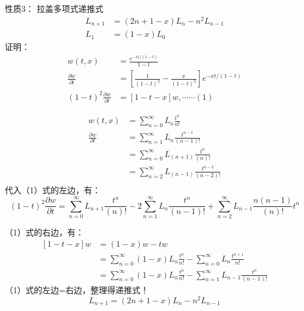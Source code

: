 	{\alert{	性质3：}}  拉盖多项式递推式
	\begin{equation*}
	\begin{split}
		L_{n+1} &= (2n+1-x) L_n  -n^2 L_{n-1}  \\
		L_1 &=(1-x) L_0 
	\end{split}		
	\end{equation*}	
	{\alert{	证明：}}   
	\begin{equation*}
	\begin{split}
		w(t,x) &=\frac{e^{-xt/(1-t) } } {1-t}\\
		\frac{\partial w}{\partial t}  &= [\frac{1}{(1-t)^2} -\frac{x}{(1-t)^3}]  e^{-xt/(1-t) }     \\
		(1-t)^2	\frac{\partial w}{\partial t}  &= [1 -t-x] w   , \cdots \cdots  (1)
	\end{split}		
	\end{equation*}	
		


	\begin{equation*}
	\begin{split}
		w(t,x) &= \sum_{n=0}^{\infty}  L_n  \frac{t^n}{n!} \\
		\frac{\partial w}{\partial t}  &=   \sum_{n=1}^{\infty}  L_n  \frac{t^{n-1}}{(n-1)!}   \\
		&=  \sum_{n=0}^{\infty}  L_{(n+1)}  \frac{t^n}{(n)!} \\
		&=  \sum_{n=2}^{\infty}  L_{(n-1)}  \frac{t^{n-2}}{(n-2)!} \\
	\end{split}		
	\end{equation*}	
	代入（1）式的左边，有：
	\begin{equation*}
		(1-t)^2	\frac{\partial w}{\partial t}  =   \sum_{n=0}^{\infty}  L_{n+1}  \frac{t^n}{(n)!}  -2  \sum_{n=1}^{\infty}  L_{n}  \frac{t^n}{(n-1)!} +  \sum_{n=2}^{\infty}  L_{n-1}  \frac{n(n-1)}{(n)!}  t^n
	\end{equation*}	
		


	（1）式的右边，有：
	\begin{equation*}
		\begin{split}
			[1 -t-x] w &= (1-x)w -t w \\
			& =   \sum_{n=0}^{\infty} (1-x) L_n  \frac{t^n}{n!} -  \sum_{n=0}^{\infty}  L_n  \frac{t^{n+1}}{n!} \\
			&=  \sum_{n=0}^{\infty} (1-x) L_n  \frac{t^n}{n!} -  \sum_{n=1}^{\infty}  L_{n-1}  \frac{t^n}{(n-1)!}
		\end{split}		
	\end{equation*}	
	（1）式的左边=右边，整理得递推式！
	\begin{equation*}
			L_{n+1} = (2n+1-x) L_n  -n^2 L_{n-1}  
	\end{equation*}	
		



